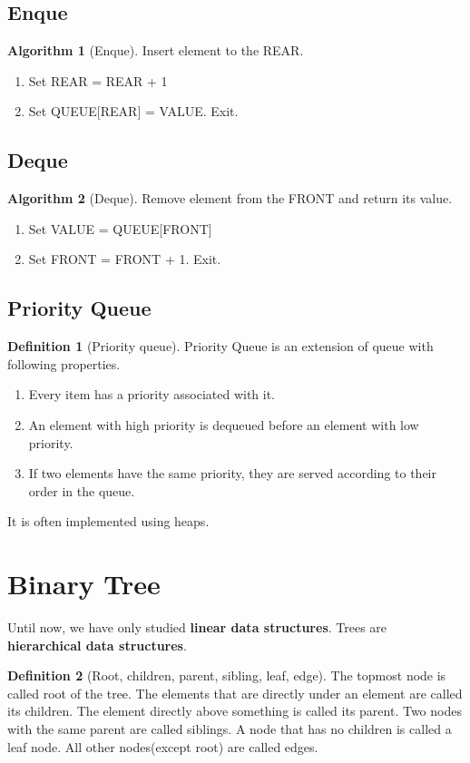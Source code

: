 \documentclass[10pt, a4paper]{extarticle}
\theoremstyle{definition}
\newtheorem{alg}{Algorithm}
\newtheorem{defn}{Definition}
\begin{document}
\subsection{Enque}
\begin{alg}[Enque]
	Insert element to the REAR.
	\begin{enumerate}
		\item Set REAR = REAR + 1
		\item Set QUEUE[REAR] = VALUE. Exit.
	\end{enumerate}
\end{alg}
\subsection{Deque}
\begin{alg}[Deque]
	Remove element from the FRONT and return its value.
	\begin{enumerate}
		\item Set VALUE = QUEUE[FRONT]
		\item Set FRONT = FRONT + 1. Exit.
	\end{enumerate}
\end{alg}

\subsection{Priority Queue}
\begin{defn}[Priority queue]
	Priority Queue is an extension of queue with following properties.
	\begin{enumerate}
		\item Every item has a priority associated with it.
		\item An element with high priority is dequeued before an element with low priority.
		\item If two elements have the same priority, they are served according to their order in the queue.
	\end{enumerate}
	It is often implemented using heaps.
\end{defn}

\section{Binary Tree}
Until  now, we have only studied \textbf{linear data structures}. Trees are \textbf{hierarchical data structures}.
\begin{defn}[Root, children, parent, sibling, leaf, edge]
	The topmost node is called root of the tree. The elements that are directly under an element are called its children. The element directly above something is called its parent. Two nodes with the same parent are called siblings. A node that has no children is called a leaf node. All other nodes(except root) are called edges.
\end{defn}
\end{document}

